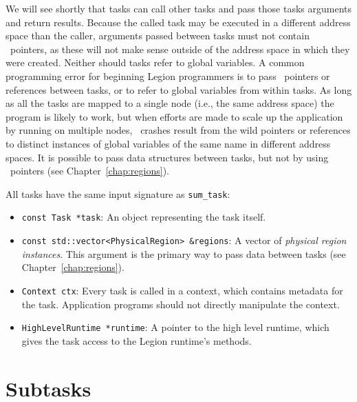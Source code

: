 We will see shortly that tasks can call other tasks and pass
those tasks arguments and return results.  Because the called task may
be executed in a different address space than the caller, arguments
passed between tasks must not contain \Cpp\ pointers, as these will
not make sense outside of the address space in which they were
created.  Neither should tasks refer to global variables. A common
programming error for beginning Legion programmers is to pass
\Cpp\ pointers or references between tasks, or to refer to global
variables from within tasks.  As long as all the tasks are mapped to a
single node (i.e., the same address space) the program is likely to
work, but when efforts are made to scale up the application by running
on multiple nodes, \Cpp\ crashes result from the wild pointers or
references to distinct instances of global variables of the same name
in different address spaces.  It is possible to pass data structures
between tasks, but not by using \Cpp\ pointers (see
Chapter~\ref{chap:regions}).

All tasks have the same input signature as {\tt sum\_task}:
\begin{itemize}

\item {\tt const Task *task}: An object representing the task itself. 

\item {\tt const std::vector<PhysicalRegion> \&regions}: A vector of {\em physical region instances}.  This argument is the
primary way to pass data between tasks (see Chapter~\ref{chap:regions}).

\item {\tt Context ctx}: Every task is called in a context, which contains metadata for the task.  Application programs
should not directly manipulate the context.

\item {\tt HighLevelRuntime *runtime}: A pointer to the high level runtime, which gives the task access to the Legion runtime's methods.

\end{itemize}

\section{Subtasks}
\label{sec:subtasks}


